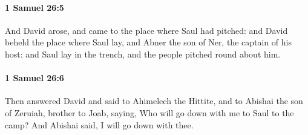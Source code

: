 		\paragraph{1 Samuel 26:5} %
			\label{1SAMUEL-26-5}

			And David arose, and came to the place where Saul had pitched: and David beheld the place where Saul lay, and Abner the son of Ner, the captain of his host: and Saul lay in the trench, and the people pitched round about him.


		\paragraph{1 Samuel 26:6} %
			\label{1SAMUEL-26-6}

			Then answered David and said to Ahimelech the Hittite, and to Abishai the son of Zeruiah, brother to Joab, saying, Who will go down with me to Saul to the camp? And Abishai said, I will go down with thee.

